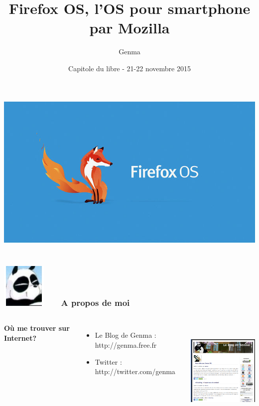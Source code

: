 \documentclass{beamer}
\title[Firefox OS, l'OS pour smartphone par Mozilla]{Firefox OS, l'OS pour smartphone par Mozilla}
\date{Capitole du libre - 21-22 novembre 2015}
\author{Genma}
\begin{document}
\begin{frame}
	\titlepage
	\begin{center}		
	\includegraphics[scale=0.2]{./images/firefox-os.jpg}
		\\	
	\\[2.5ex]
		{\tiny\CcNote{\CcLongnameByNcSa}}
		\vspace*{-2.5ex}
	\end{center}
\end{frame}

\begin{frame}
\frametitle{\includegraphics[scale=0.4]{./images/Genma.jpg} \ \ \  A propos de moi  }
\begin{columns}[c] 
\textbf{Où me trouver sur Internet?}
\begin{itemize}
\item Le Blog de Genma : http://genma.free.fr
\item Twitter : http://twitter.com/genma
\end{itemize}

\includegraphics[width=5cm,height=5cm]{./images/blog.png} 
\end{columns}
\end{frame}
\end{document}
